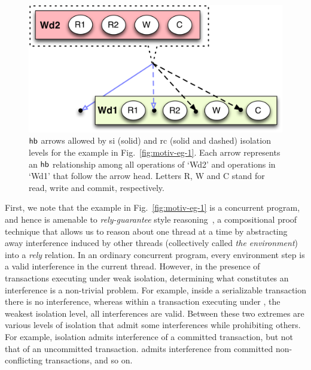 \begin{figure}
\centering
  \includegraphics[scale=0.4]{Figures/motiv-eg-1-hb}

\caption{$\textsf{hb}$ arrows allowed by {\sc si} (solid) and {\sc rc} (solid
  and dashed) isolation levels for the example in
  Fig.~\ref{fig:motiv-eg-1}. Each arrow represents an $\textsf{hb}$ relationship
  among all operations of `Wd2' and operations in `Wd1' that follow
  the arrow head. Letters R, W and C stand for read, write and commit,
  respectively.}
\label{fig:motiv-eg-1-hb}
\end{figure}

First, we note that the example in Fig.~\ref{fig:motiv-eg-1} is a
concurrent program, and hence is amenable to \emph{rely-guarantee}
style reasoning~\cite{rgjones}, a compositional proof technique that
allows us to reason about one thread at a time by abstracting away
interference induced by other threads (collectively called \emph{the
  environment}) into a \emph{rely} relation. In an ordinary concurrent
program, every environment step is a valid interference in the current
thread. However, in the presence of transactions executing under weak
isolation, determining what constitutes an interference is a
non-trivial problem. For example, inside a serializable transaction
there is no interference, whereas within a transaction executing under
, the weakest isolation level, all interferences
are valid. Between these two extremes are various levels of isolation
that admit some interferences while prohibiting others.  For example,
 isolation admits interference of a committed
transaction, but not that of an uncommitted transaction.
 admits interference from committed
non-conflicting transactions, and so on.

